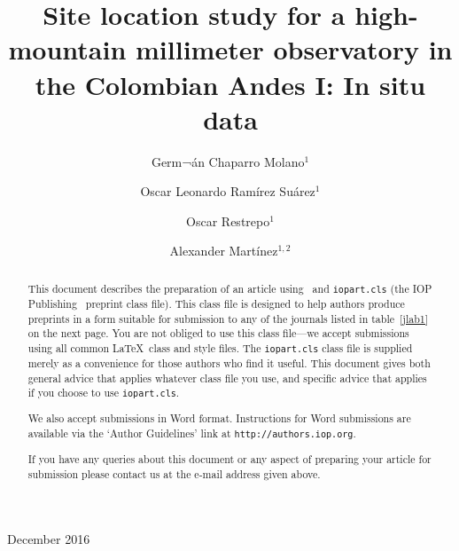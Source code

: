 \documentclass[12pt]{iopart}
\begin{document}
\title[Site Location Study for a Millimeter Observatory in the Colombian Andes I: In Situ]{Site location study for a high-mountain millimeter observatory in the Colombian Andes I: In situ data}



\author{Germ¬\'an Chaparro Molano$^{1}$}
\address{$^1$Grupo de Simulaci\'on, An\'alisis y Modelado, Vicerrector\'ia de Investigaci\'on, Universidad ECCI, Bogot\'a, Colombia}
\author{Oscar Leonardo Ram\'irez Su\'arez$^{1}$}
\address{$^1$Grupo de Simulaci\'on, An\'alisis y Modelado, Vicerrector\'ia de Investigaci\'on, Universidad ECCI, Bogot\'a, Colombia}
\author{Oscar Restrepo$^{1}$}
\address{$^1$Grupo de Simulaci\'on, An\'alisis y Modelado, Vicerrector\'ia de Investigaci\'on, Universidad ECCI, Bogot\'a, Colombia}
\author{Alexander Mart\'inez$^{1,2}$}
\address{$^1$Grupo de Simulaci\'on, An\'alisis y Modelado, Vicerrector\'ia de Investigaci\'on, Universidad ECCI, Bogot\'a, Colombia}
\address{$^2$Instituto de Hidrolog\'ia, Meteorolog\'ia y Estudios Ambientales, Bogot\'a, Colombia}
\vspace{10pt}
\begin{indented}
\item[]December 2016
\end{indented}

\begin{abstract}
This document describes the  preparation of an article using \LaTeXe\ and 
\verb"iopart.cls" (the IOP Publishing \LaTeXe\ preprint class file).
This class file is designed to help 
authors produce preprints in a form suitable for submission to any of the
journals listed in table~\ref{jlab1} on the next page.  You are not obliged to use this class file---we accept
submissions using all common \LaTeX\ class and style files.  The \verb"iopart.cls"
class file is supplied merely as a convenience for those authors who find it useful.
This document gives both general advice that applies whatever class file you use, and specific advice
that applies if you choose to use \verb"iopart.cls".

We also accept submissions in Word format.  Instructions for Word submissions are available via the `Author Guidelines' link at \verb"http://authors.iop.org".

If you have any queries about this document or any aspect of preparing your article for submission please contact us at the e-mail address given above.
\end{abstract}
\end{document}
